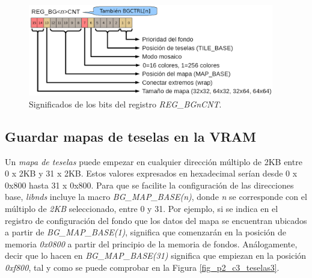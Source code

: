 \begin{figure}[t]
\centering
\includegraphics[height=4cm]{Figuras/C7/c7_reg_teselado.PNG}
\caption{Significados de los bits del registro \textit{REG\_BGnCNT}.}
\label{fig_p2_c3_reg_teselado}
\end{figure}

\subsection{Guardar mapas de teselas en la VRAM}
Un \textit{mapa de teselas} puede empezar en cualquier dirección múltiplo de 2KB entre 0 x 2KB y 31 x 2KB. Estos valores expresados en hexadecimal serían desde 0 x 0x800 hasta 31 x 0x800. Para que se facilite la configuración de las direcciones base, \textit{libnds} incluye la macro \textit{BG\_MAP\_BASE(n)}, donde \textit{n} se corresponde con el múltiplo de \textit{2KB} seleccionado, entre 0 y 31. Por ejemplo, si se indica en el registro de configuración del fondo que los datos del mapa se encuentran ubicados a partir de \textit{BG\_MAP\_BASE(1)}, significa que comenzarán en la posición de memoria \textit{0x0800} a partir del principio de la memoria de fondos. Análogamente, decir que lo hacen en \textit{BG\_MAP\_BASE(31)} significa que empiezan en la posición \textit{\textit{0xf800}}, tal y como se puede comprobar en la Figura \ref{fig_p2_c3_teselas3}.

